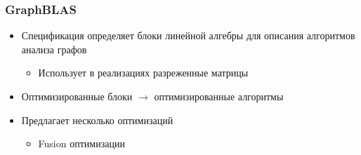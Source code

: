 \documentclass[xcolor=table,aspectratio=169]{beamer}
\begin{document}
\begin{frame}[c,fragile] \frametitle{GraphBLAS}




    




\begin{itemize}
    \item Спецификация определяет блоки линейной алгебры для описания алгоритмов анализа графов
    \vfill
    \begin{itemize}
        \item Использует в реализациях разреженные матрицы
    \end{itemize}
    \vfill
    \item Оптимизированные блоки $\to$ оптимизированные алгоритмы
    \vfill
    \item Предлагает несколько оптимизаций
    \vfill
    \begin{itemize}
        \item \textcolor{codepurple}{Fusion оптимизации}
    \end{itemize}
\end{itemize}

\end{frame}
\end{document}
